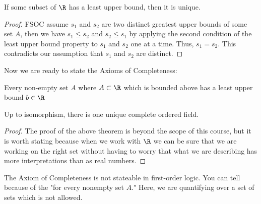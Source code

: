 \begin{theorem}
	If some subset of $\R$ has a least upper bound, then it is unique.
\end{theorem}

\begin{proof}
	FSOC assume $s_1$ and $s_2$ are two distinct greatest upper bounds of some set $A$, then we have $s_1 \le s_2$ and $s_2 \le s_1$ by applying the second condition of the least upper bound property to $s_1$ and $s_2$ one at a time. Thus, $s_1 = s_2$. This contradicts our assumption that $s_1$ and $s_2$ are distinct.
\end{proof}
Now we are ready to state the Axioms of Completeness: 

\begin{axiom}
	Every non-empty set $A$ where  $A \subset \R$ which is bounded above has a least upper bound $b \in \R$
\end{axiom}

\begin{theorem}
	Up to isomorphism, there is one unique complete ordered field. 
\end{theorem}

\begin{proof}
	The proof of the above theorem is beyond the scope of this course, but it is worth stating because when we work with $\R$ we can be sure that we are working on the right set without having to worry that what we are describing has more interpretations than as real numbers. 
\end{proof}

\begin{note}
	The Axiom of Completeness is not stateable in first-order logic. You can tell because of the "for every nonempty set $A$." Here, we are quantifying over a set of sets which is not allowed.
\end{note}
